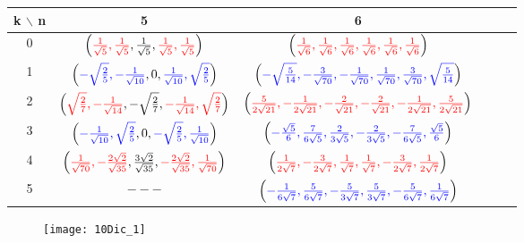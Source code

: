 \begin{center}
\begin{tabular}{ c c c c c c }
k $\backslash$ n & 5 & 6  \\ 
\hline
0 & 
$\left(
{\color{red}{\frac{1}{\sqrt{5}}, \frac{1}{\sqrt{5}}}}, \frac{1}{\sqrt{5}},
{\color{red}{\frac{1}{\sqrt{5}}, \frac{1}{\sqrt{5}}}} 
\right)$ 
& $\left(
{\color{red}{\frac{1}{\sqrt{6}}, \frac{1}{\sqrt{6}}, \frac{1}{\sqrt{6}},
\frac{1}{\sqrt{6}}, \frac{1}{\sqrt{6}}, \frac{1}{\sqrt{6}}}} 
\right)$ \\ 
1 &  
$\left(
{\color{blue}{-\sqrt{\frac{2}{5}}, -\frac{1}{\sqrt{10}}}}, 0,
{\color{blue}{\frac{1}{\sqrt{10}}, \sqrt{\frac{2}{5}}}} 
\right)$  & 
$\left(
{\color{blue}{-\sqrt{\frac{5}{14}}, -\frac{3}{\sqrt{70}}, -\frac{1}{\sqrt{70}},
\frac{1}{\sqrt{70}}, \frac{3}{\sqrt{70}}, \sqrt{\frac{5}{14}} }}
\right)$ \\ 
2 & 
$\left(
{\color{red}{\sqrt{\frac{2}{7}}, -\frac{1}{\sqrt{14}}}}, -\sqrt{\frac{2}{7}},
{\color{red}{-\frac{1}{\sqrt{14}}, \sqrt{\frac{2}{7}}}} \right)$ 
& $\left(
{\color{red}{\frac{5}{2\sqrt{21}}, -\frac{1}{2\sqrt{21}}, -\frac{2}{\sqrt{21}},
-\frac{2}{\sqrt{21}}, -\frac{1}{2\sqrt{21}}, \frac{5}{2\sqrt{21}}}} 
\right)$ \\ 
3 & 
$\left(
{\color{blue}{-\frac{1}{\sqrt{10}}, \sqrt{\frac{2}{5}}}}, 0,
{\color{blue}{-\sqrt{\frac{2}{5}}, \frac{1}{\sqrt{10}}}} 
\right)$ &
$\left(
{\color{blue}{-\frac{\sqrt{5}}{6}, \frac{7}{6\sqrt{5}}, \frac{2}{3\sqrt{5}},
-\frac{2}{3\sqrt{5}}, -\frac{7}{6\sqrt{5}}, \frac{\sqrt{5}}{6}}}
\right)$ \\ 
4 & $\left(
{\color{red}{\frac{1}{\sqrt{70}}, -\frac{2\sqrt{2}}{\sqrt{35}}}}, 
\frac{3\sqrt{2}}{\sqrt{35}},
{\color{red}{-\frac{2\sqrt{2}}{\sqrt{35}}, \frac{1}{\sqrt{70}}}} 
\right) $ & 
$\left( 
{\color{red}{\frac{1}{2\sqrt{7}}, -\frac{3}{2\sqrt{7}}, \frac{1}{\sqrt{7}},
\frac{1}{\sqrt{7}}, -\frac{3}{2\sqrt{7}}, \frac{1}{2\sqrt{7}}}} 
\right)$ \\ 
5 & $---$ & 
$\left(
{\color{blue}{-\frac{1}{6\sqrt{7}}, \frac{5}{6\sqrt{7}}, -\frac{5}{3\sqrt{7}},
\frac{5}{3\sqrt{7}}, -\frac{5}{6\sqrt{7}}, \frac{1}{6\sqrt{7}}}} 
\right)$ 
\end{tabular}
\end{center}


\begin{figure}[H]
	\centering
	\texttt{[image: 10Dic\_1]} 
\end{figure}	

